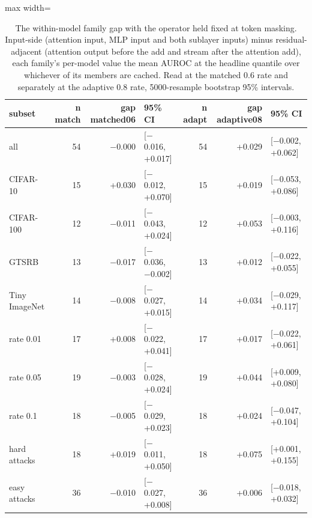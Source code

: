 \begin{table}[htbp]
\centering
\small
\caption{The within-model family gap with the operator held fixed at token masking. Input-side (attention input, MLP input and both sublayer inputs) minus residual-adjacent (attention output before the add and stream after the attention add), each family's per-model value the mean AUROC at the headline quantile over whichever of its members are cached. Read at the matched 0.6 rate and separately at the adaptive 0.8 rate, 5000-resample bootstrap 95\% intervals.}
\label{tab:family-split}
\begin{adjustbox}{max width=\linewidth}
\begin{tabular}{lrrlrrl}
\toprule
subset & n match & gap matched06 & 95\% CI & n adapt & gap adaptive08 & 95\% CI \\
\midrule
all & 54 & $-$0.000 & [$-$0.016, +0.017] & 54 & +0.029 & [$-$0.002, +0.062] \\
CIFAR-10 & 15 & +0.030 & [$-$0.012, +0.070] & 15 & +0.019 & [$-$0.053, +0.086] \\
CIFAR-100 & 12 & $-$0.011 & [$-$0.043, +0.024] & 12 & +0.053 & [$-$0.003, +0.116] \\
GTSRB & 13 & $-$0.017 & [$-$0.036, $-$0.002] & 13 & +0.012 & [$-$0.022, +0.055] \\
Tiny ImageNet & 14 & $-$0.008 & [$-$0.027, +0.015] & 14 & +0.034 & [$-$0.029, +0.117] \\
rate 0.01 & 17 & +0.008 & [$-$0.022, +0.041] & 17 & +0.017 & [$-$0.022, +0.061] \\
rate 0.05 & 19 & $-$0.003 & [$-$0.028, +0.024] & 19 & +0.044 & [+0.009, +0.080] \\
rate 0.1 & 18 & $-$0.005 & [$-$0.029, +0.023] & 18 & +0.024 & [$-$0.047, +0.104] \\
hard attacks & 18 & +0.019 & [$-$0.011, +0.050] & 18 & +0.075 & [+0.001, +0.155] \\
easy attacks & 36 & $-$0.010 & [$-$0.027, +0.008] & 36 & +0.006 & [$-$0.018, +0.032] \\
\bottomrule
\end{tabular}
\end{adjustbox}
\end{table}
